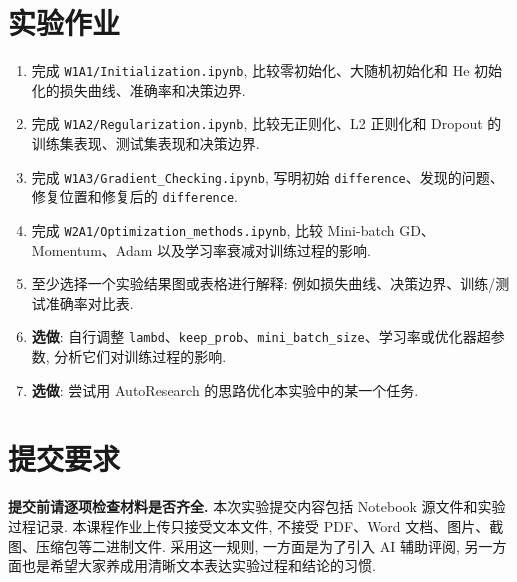 \documentclass{../../nndlcourse}
\begin{document}
\section{实验作业}
\begin{enumerate}
    \item 完成 \texttt{W1A1/Initialization.ipynb}, 比较零初始化、大随机初始化和 He 初始化的损失曲线、准确率和决策边界.
    \item 完成 \texttt{W1A2/Regularization.ipynb}, 比较无正则化、L2 正则化和 Dropout 的训练集表现、测试集表现和决策边界.
    \item 完成 \texttt{W1A3/Gradient\_Checking.ipynb}, 写明初始 \texttt{difference}、发现的问题、修复位置和修复后的 \texttt{difference}.
    \item 完成 \texttt{W2A1/Optimization\_methods.ipynb}, 比较 Mini-batch GD、Momentum、Adam 以及学习率衰减对训练过程的影响.
    \item 至少选择一个实验结果图或表格进行解释: 例如损失曲线、决策边界、训练/测试准确率对比表.
    \item \textbf{选做}: 自行调整 \texttt{lambd}、\texttt{keep\_prob}、\texttt{mini\_batch\_size}、学习率或优化器超参数, 分析它们对训练过程的影响.
    \item \textbf{选做}: 尝试用 AutoResearch 的思路优化本实验中的某一个任务.
\end{enumerate}


\section{提交要求}

\textbf{提交前请逐项检查材料是否齐全.} 本次实验提交内容包括 Notebook 源文件和实验过程记录. 本课程作业上传只接受文本文件, 不接受 PDF、Word 文档、图片、截图、压缩包等二进制文件. 采用这一规则, 一方面是为了引入 AI 辅助评阅, 另一方面也是希望大家养成用清晰文本表达实验过程和结论的习惯.
\end{document}
